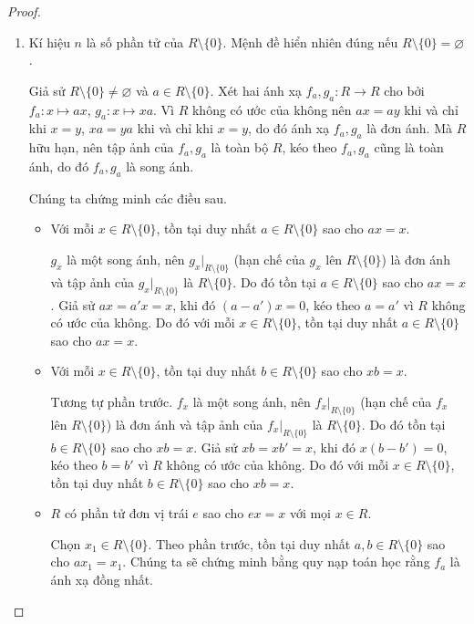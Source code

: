 \begin{proof}
    \begin{enumerate}[label = (\alph*)]
        \item Kí hiệu $n$ là số phần tử của $R\setminus\{0\}$. Mệnh đề hiển nhiên đúng nếu $R\setminus\{ 0 \} = \varnothing$.

              Giả sử $R\setminus\{0\}\ne\varnothing$ và $a\in R\setminus\{ 0 \}$. Xét hai ánh xạ $f_{a}, g_{a}: R\to R$ cho bởi $f_{a}: x\mapsto ax$, $g_{a}: x\mapsto xa$. Vì $R$ không có ước của không nên $ax = ay$ khi và chỉ khi $x = y$, $xa = ya$ khi và chỉ khi $x = y$, do đó ánh xạ $f_{a}, g_{a}$ là đơn ánh. Mà $R$ hữu hạn, nên tập ảnh của $f_{a}, g_{a}$ là toàn bộ $R$, kéo theo $f_{a}, g_{a}$ cũng là toàn ánh, do đó $f_{a}, g_{a}$ là song ánh.

              Chúng ta chứng minh các điều sau.
              \begin{itemize}
                  \item Với mỗi $x\in R\setminus\{0\}$, tồn tại duy nhất $a\in R\setminus\{0\}$ sao cho $ax = x$.

                        $g_{x}$ là một song ánh, nên $g_{x}\vert_{R\setminus\{0\}}$ (hạn chế của $g_{x}$ lên $R\setminus\{0\}$) là đơn ánh và tập ảnh của $g_{x}\vert_{R\setminus\{0\}}$ là $R\setminus\{0\}$. Do đó tồn tại $a\in R\setminus \{0\}$ sao cho $ax = x$. Giả sử $ax = a'x = x$, khi đó $(a - a')x = 0$, kéo theo $a = a'$ vì $R$ không có ước của không. Do đó với mỗi $x\in R\setminus\{0\}$, tồn tại duy nhất $a\in R\setminus\{0\}$ sao cho $ax = x$.
                  \item Với mỗi $x\in R\setminus\{0\}$, tồn tại duy nhất $b\in R\setminus\{0\}$ sao cho $xb = x$.

                        Tương tự phần trước. $f_{x}$ là một song ánh, nên $f_{x}\vert_{R\setminus\{0\}}$ (hạn chế của $f_{x}$ lên $R\setminus\{0\}$) là đơn ánh và tập ảnh của $f_{x}\vert_{R\setminus\{0\}}$ là $R\setminus\{0\}$. Do đó tồn tại $b\in R\setminus \{0\}$ sao cho $xb = x$. Giả sử $xb = xb' = x$, khi đó $x(b - b') = 0$, kéo theo $b = b'$ vì $R$ không có ước của không. Do đó với mỗi $x\in R\setminus\{0\}$, tồn tại duy nhất $b\in R\setminus\{0\}$ sao cho $xb = x$.
                  \item $R$ có phần tử đơn vị trái $e$ sao cho $ex = x$ với mọi $x\in R$.

                        Chọn $x_{1}\in R\setminus\{0\}$. Theo phần trước, tồn tại duy nhất $a, b\in R\setminus\{0\}$ sao cho $ax_{1} = x_{1}$. Chúng ta sẽ chứng minh bằng quy nạp toán học rằng $f_{a}$ là ánh xạ đồng nhất.


\end{itemize}
\end{enumerate}
\end{proof}
